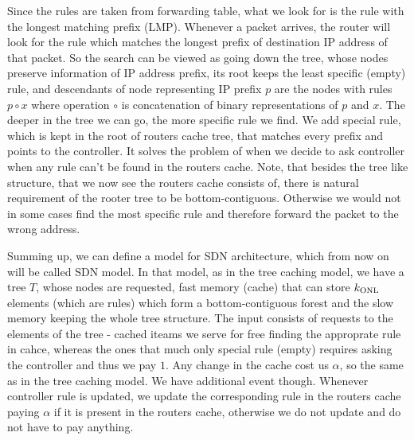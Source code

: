 Since the rules are taken from forwarding table, what we look for is the rule
with the longest matching prefix (LMP). Whenever a packet arrives, the router
will look for the rule which matches the longest prefix of destination IP
address of that packet. So the search can be viewed as going down the tree,
whose nodes preserve information of IP address prefix, its root keeps the least
specific (empty) rule, and descendants of node representing IP prefix $p$ are
the nodes with rules $p \circ x$ where operation $\circ$ is concatenation of
binary representations of $p$ and $x$. The deeper in the tree we can go, the
more specific rule we find. We add special rule, which is kept in the root of
routers cache tree, that matches every prefix and points to the controller. It
solves the problem of when we decide to ask controller when any rule can't be
found in the routers cache. Note, that besides the tree like structure, that we
now see the routers cache consists of, there is natural requirement of the
rooter tree to be bottom-contiguous. Otherwise we would not in some cases find
the most specific rule and therefore forward the packet to the wrong address. 

Summing up, we can define a model for SDN architecture, which from now on will
be called SDN model. In that model, as in the tree caching model, we have a tree
$T$, whose nodes are requested, fast memory (cache) that can store $k_{\mathrm{ONL}}$
elements (which are rules) which form a bottom-contiguous forest and the slow
memory keeping the whole tree structure. The input consists of requests to the
elements of the tree - cached iteams we serve for free finding the approprate
rule in cahce, whereas the ones that much only special rule (empty) requires
asking the controller and thus we pay $1$. Any change in the cache cost us
$\alpha$, so the same as in the tree caching model. We have additional event
though. Whenever controller rule is updated, we update the corresponding rule in
the routers cache paying $\alpha$ if it is present in the routers cache,
otherwise we do not update and do not have to pay anything.

